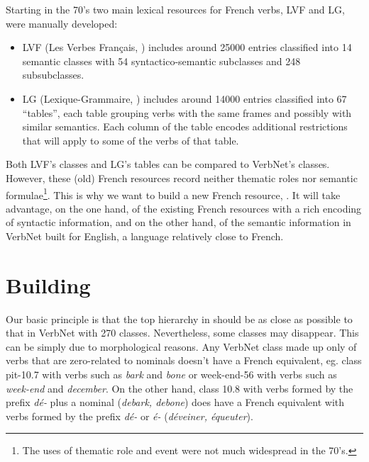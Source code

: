 Starting in the 70's two main lexical resources for French verbs, LVF and LG,
were manually developed:


\begin{itemize}

    \item LVF (Les Verbes Français, \cite{dubois1997verbes}) includes around
    25000 entries classified into 14 semantic classes with 54 syntactico-semantic
    subclasses and 248 subsubclasses.

    \item LG (Lexique-Grammaire, \cite{gross1975methodes,boons1976structure})
    includes around 14000 entries classified into 67 ``tables'', each table
    grouping verbs with the same frames and possibly with similar semantics. Each
    column of the table encodes additional restrictions that will apply to some of
    the verbs of that table.


\end{itemize}

Both LVF's classes and LG's tables can be compared to VerbNet's classes.
However, these (old) French resources record neither thematic roles nor
semantic formulae\footnote{The uses of thematic role and event were not
much widespread in the 70's.}. This is why we want to build a new French
resource, \verbenet{}. It will take advantage, on the one hand, of the existing
French resources with a rich encoding of syntactic information, and on the
other hand, of the semantic information in VerbNet built for English, a
language relatively close to French.

\section{Building \verbenet{}}

Our basic principle is that the top hierarchy in \verbenet{} should be as close
as possible to that in VerbNet with 270 classes. Nevertheless, some classes may
disappear. This can be simply due to morphological reasons. Any VerbNet class
made up only of verbs that are zero-related to nominals doesn't have a French
equivalent, eg. class pit-10.7 with verbs such as \emph{bark} and \emph{bone}
or week-end-56 with verbs such as \emph{week-end} and \emph{december}. On the
other hand, class 10.8 with verbs formed by the prefix \emph{dé-} plus a
nominal (\emph{debark, debone}) does have a French equivalent with verbs formed
by the prefix \emph{dé-} or \emph{é-} (\emph{déveiner, équeuter}).

